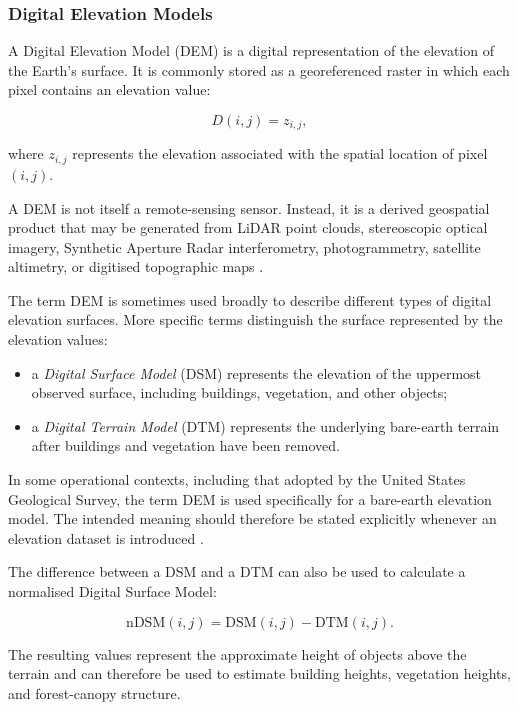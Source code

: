 \documentclass[11pt,a4paper]{article}
\begin{document}
\subsubsection{Digital Elevation Models}

A Digital Elevation Model (DEM) is a digital representation of the
elevation of the Earth's surface. It is commonly stored as a
georeferenced raster in which each pixel contains an elevation value:

\[
D(i,j) = z_{i,j},
\]

where \(z_{i,j}\) represents the elevation associated with the spatial
location of pixel \((i,j)\).

A DEM is not itself a remote-sensing sensor. Instead, it is a derived
geospatial product that may be generated from LiDAR point clouds,
stereoscopic optical imagery, Synthetic Aperture Radar interferometry,
photogrammetry, satellite altimetry, or digitised topographic maps
\cite{guth2021dem}.

The term DEM is sometimes used broadly to describe different types of
digital elevation surfaces. More specific terms distinguish the surface
represented by the elevation values:

\begin{itemize}
    \item a \textit{Digital Surface Model} (DSM) represents the elevation
    of the uppermost observed surface, including buildings, vegetation,
    and other objects;

    \item a \textit{Digital Terrain Model} (DTM) represents the underlying
    bare-earth terrain after buildings and vegetation have been removed.
\end{itemize}

In some operational contexts, including that adopted by the United
States Geological Survey, the term DEM is used specifically for a
bare-earth elevation model. The intended meaning should therefore be
stated explicitly whenever an elevation dataset is introduced
\cite{usgs_dem_definition}.

The difference between a DSM and a DTM can also be used to calculate a
normalised Digital Surface Model:

\[
\mathrm{nDSM}(i,j)
=
\mathrm{DSM}(i,j)-\mathrm{DTM}(i,j).
\]

The resulting values represent the approximate height of objects above
the terrain and can therefore be used to estimate building heights,
vegetation heights, and forest-canopy structure.
\end{document}
